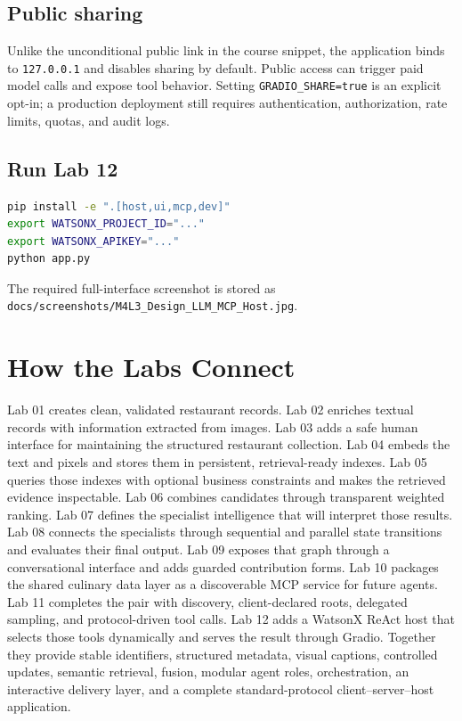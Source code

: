 \documentclass[11pt]{article}
\begin{document}
\subsection{Public sharing}

Unlike the unconditional public link in the course snippet, the application
binds to \texttt{127.0.0.1} and disables sharing by default. Public access can
trigger paid model calls and expose tool behavior. Setting
\texttt{GRADIO\_SHARE=true} is an explicit opt-in; a production deployment still
requires authentication, authorization, rate limits, quotas, and audit logs.

\subsection{Run Lab 12}

\begin{lstlisting}[language=bash]
pip install -e ".[host,ui,mcp,dev]"
export WATSONX_PROJECT_ID="..."
export WATSONX_APIKEY="..."
python app.py
\end{lstlisting}

The required full-interface screenshot is stored as
\texttt{docs/screenshots/M4L3\_Design\_LLM\_MCP\_Host.jpg}.

\section{How the Labs Connect}

Lab 01 creates clean, validated restaurant records. Lab 02 enriches textual
records with information extracted from images. Lab 03 adds a safe human
interface for maintaining the structured restaurant collection. Lab 04 embeds
the text and pixels and stores them in persistent, retrieval-ready indexes.
Lab 05 queries those indexes with optional business constraints and makes the
retrieved evidence inspectable. Lab 06 combines candidates through transparent
weighted ranking. Lab 07 defines the specialist intelligence that will interpret
those results. Lab 08 connects the specialists through sequential and parallel
state transitions and evaluates their final output. Lab 09 exposes that graph
through a conversational interface and adds guarded contribution forms. Lab 10
packages the shared culinary data layer as a discoverable MCP service for future
agents. Lab 11 completes the pair with discovery, client-declared roots,
delegated sampling, and protocol-driven tool calls. Lab 12 adds a WatsonX ReAct
host that selects those tools dynamically and serves the result through Gradio.
Together they provide stable identifiers, structured metadata, visual captions,
controlled updates, semantic retrieval, fusion, modular agent roles,
orchestration, an interactive delivery layer, and a complete standard-protocol
client--server--host application.
\end{document}
